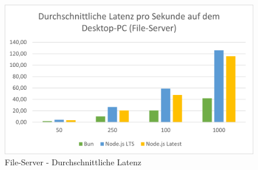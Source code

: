 \begin{figure}[h]
	\centering
	\includegraphics[width=\linewidth]{./images/fileServerAverageLatencyDesktop.png}
	\caption{File-Server - Durchschnittliche Latenz}
	\label{fig:fileServerAverageLatency}
\end{figure}

